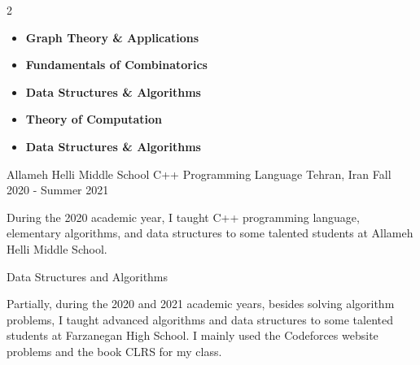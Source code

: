 \begin{multicols}{2}
\begin{itemize}[leftmargin=0.9em, itemsep=0.5pt, parsep=0pt, topsep=0pt, label={}]
    \item {\fontsize{8pt}{9pt}\selectfont \textbf{Graph Theory \& Applications} \textbar\  \hfill {}}
    \item {\fontsize{8pt}{9pt}\selectfont \textbf{Fundamentals of Combinatorics} \textbar\  \hfill {}}
    \item {\fontsize{8pt}{9pt}\selectfont \textbf{Data Structures \& Algorithms} \textbar\  \hfill {}}
    \item {\fontsize{8pt}{9pt}\selectfont \textbf{Theory of Computation} \textbar\  \hfill {}}
    \item {\fontsize{8pt}{9pt}\selectfont \textbf{Data Structures \& Algorithms} \textbar\  \hfill {}}
  \end{itemize}
\end{multicols}

\vspace{-10pt}
\begin{cventries}
  \cventry
  {Allameh Helli Middle School}
  {C++ Programming Language}
  {Tehran, Iran}
  {Fall 2020 - Summer 2021}
  {
    \begin{cvitems}
      \item {During the 2020 academic year, I taught C++ programming language, elementary algorithms, and data structures to some talented students at Allameh Helli Middle School.}
    \end{cvitems}
  }
  \vspace{5pt}
  \cvproject
  {Data Structures and Algorithms}
  {}
  {
    \begin{cvitems}
      \item {Partially, during the 2020 and 2021 academic years, besides solving algorithm problems, I taught advanced algorithms and data structures to some talented students at Farzanegan High School. I mainly used the Codeforces website problems and the book CLRS for my class.}
    \end{cvitems}
  }
\end{cventries}
\vspace{-10pt}
